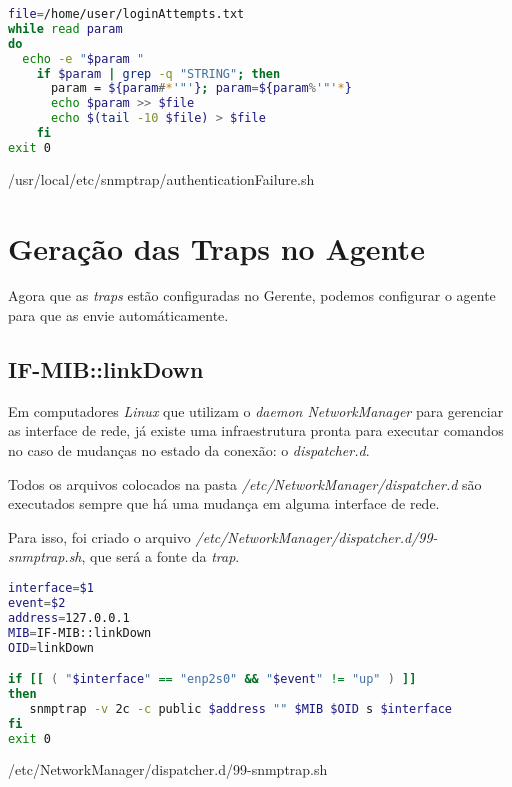 \documentclass{article}
\begin{document}
\begin{program}
  \begin{lstlisting}[language=bash]
file=/home/user/loginAttempts.txt
while read param
do
  echo -e "$param "
    if $param | grep -q "STRING"; then
      param = ${param#*'"'}; param=${param%'"'*}
      echo $param >> $file
      echo $(tail -10 $file) > $file
    fi
exit 0
\end{lstlisting}
\caption{/usr/local/etc/snmptrap/authenticationFailure.sh}
\end{program}

\section{Geração das Traps no Agente}

\par Agora que as \textit{traps} estão configuradas no Gerente, podemos configurar o agente para que as envie automáticamente.

\subsection{IF-MIB::linkDown}

\par Em computadores \textit{Linux} que utilizam o \textit{daemon NetworkManager} para gerenciar as interface de rede, já existe uma infraestrutura pronta para executar comandos no caso de mudanças no estado da conexão: o \textit{dispatcher.d}.

\par Todos os arquivos colocados na pasta \textit{/etc/NetworkManager/dispatcher.d} são executados sempre que há uma mudança em alguma interface de rede.
\par Para isso, foi criado o arquivo \textit{/etc/NetworkManager/dispatcher.d/99-snmptrap.sh}, que será a fonte da \textit{trap}.

\begin{program}
\begin{lstlisting}[language=bash]
interface=$1
event=$2
address=127.0.0.1
MIB=IF-MIB::linkDown
OID=linkDown

if [[ ( "$interface" == "enp2s0" && "$event" != "up" ) ]]
then
   snmptrap -v 2c -c public $address "" $MIB $OID s $interface
fi
exit 0

\end{lstlisting}
\caption{/etc/NetworkManager/dispatcher.d/99-snmptrap.sh}
\end{program}
\end{document}
